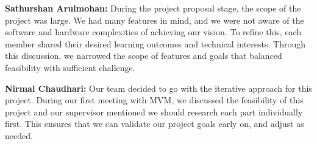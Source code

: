 \documentclass{article}
\begin{document}
\begin{enumerate}
    \textbf{Sathurshan Arulmohan:} During the project proposal stage, the scope
    of the project was large. We had many features in mind, and we were not
    aware of the software and hardware complexities of achieving our vision. To
    refine this, each member shared their desired learning outcomes and
    technical interests. Through this discussion, we narrowed the scope of
    features and goals that balanced feasibility with sufficient challenge.

    \textbf{Nirmal Chaudhari:} Our team decided to go with the iterative
    approach for this project. During our first meeting with MVM, we discussed
    the feasibility of this project and our supervisor mentioned we should
    research each part individually first. This ensures that we can validate our
    project goals early on, and adjust as needed. 

\end{enumerate}  



\end{document}
